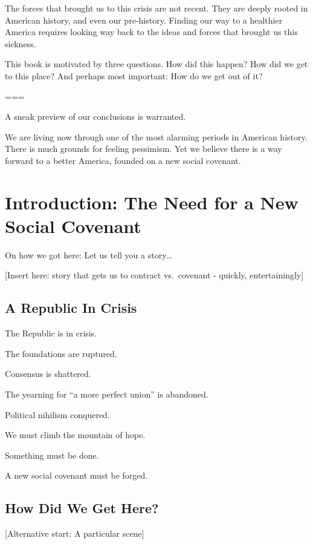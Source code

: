 \documentclass[
]{book}
\begin{document}
The forces that brought us to this crisis are not recent. They are deeply rooted in American history, and even our pre-history. Finding our way to a healthier America requires looking way back to the ideas and forces that brought us this sickness.

This book is motivated by three questions. How did this happen? How did we get to this place? And perhaps most important: How do we get out of it?

===

A sneak preview of our conclusions is warranted.

We are living now through one of the most alarming periods in American history. There is much grounds for feeling pessimism. Yet we believe there is a way forward to a better America, founded on a new social covenant.

\hypertarget{intro}{%
\chapter{Introduction: The Need for a New Social Covenant}\label{intro}}

On how we got here: Let us tell you a story\ldots{}

{[}Insert here: story that gets us to contract vs.~covenant - quickly, entertainingly{]}

\hypertarget{a-republic-in-crisis}{%
\section{A Republic In Crisis}\label{a-republic-in-crisis}}

The Republic is in crisis.

The foundations are ruptured.

Consensus is shattered.

The yearning for ``a more perfect union'' is abandoned.

Political nihilism conquered.

We must climb the mountain of hope.

Something must be done.

A new social covenant must be forged.

\hypertarget{how-did-we-get-here}{%
\section{How Did We Get Here?}\label{how-did-we-get-here}}

{[}Alternative start: A particular scene{]}
\end{document}
